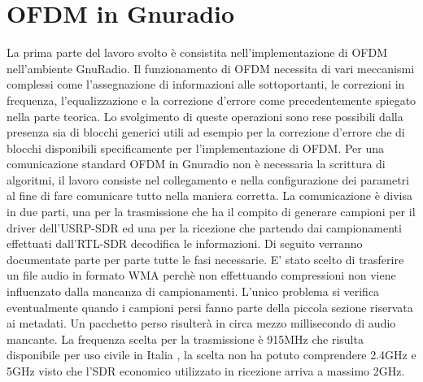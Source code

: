 \chapter{OFDM in Gnuradio}
\label{cha:789}
La prima parte del lavoro svolto è consistita nell'implementazione di OFDM nell'ambiente GnuRadio. Il funzionamento di OFDM necessita di vari meccanismi complessi come l'assegnazione di informazioni alle sottoportanti, le correzioni in frequenza, l'equalizzazione e la correzione d'errore come precedentemente spiegato nella parte teorica. Lo svolgimento di queste operazioni sono rese possibili dalla presenza sia di blocchi generici utili ad esempio per la correzione d'errore che di blocchi disponibili specificamente per l'implementazione di OFDM. Per una comunicazione standard OFDM in Gnuradio non è necessaria la scrittura di algoritmi, il lavoro consiste nel collegamento e nella configurazione dei parametri al fine di fare comunicare tutto nella maniera corretta.
La comunicazione è divisa in due parti, una per la trasmissione che ha il compito di generare campioni per il driver dell'USRP-SDR ed una per la ricezione che partendo dai campionamenti effettuati dall'RTL-SDR decodifica le informazioni. Di seguito verranno documentate parte per parte tutte le fasi necessarie.
E' stato scelto di trasferire un file audio in formato WMA perchè non effettuando compressioni non viene influenzato dalla mancanza di campionamenti. L'unico problema si verifica eventualmente quando i campioni persi fanno parte della piccola sezione riservata ai metadati. Un pacchetto perso risulterà in circa mezzo millisecondo di audio mancante. La frequenza scelta per la trasmissione è 915MHz che risulta disponibile per uso civile in Italia \cite{frequenze}, la scelta non ha potuto comprendere 2.4GHz e 5GHz visto che l'SDR economico utilizzato in ricezione arriva a massimo 2GHz.
